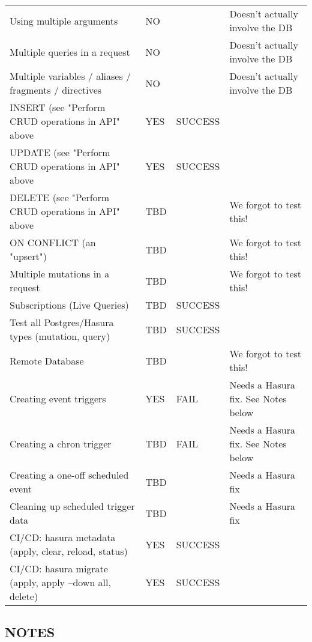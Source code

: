 \documentclass[11pt]{article}
\begin{document}
\begin{center}
\begin{tabular}{llll}
Using multiple arguments & NO &  & Doesn't actually involve the DB\\
Multiple queries in a request & NO &  & Doesn't actually involve the DB\\
Multiple variables / aliases / fragments / directives & NO &  & Doesn't actually involve the DB\\
INSERT (see "Perform CRUD operations in API" above & YES & SUCCESS & \\
UPDATE (see "Perform CRUD operations in API" above & YES & SUCCESS & \\
DELETE (see "Perform CRUD operations in API" above & TBD &  & We forgot to test this!\\
ON CONFLICT (an "upsert") & TBD &  & We forgot to test this!\\
Multiple mutations in a request & TBD &  & We forgot to test this!\\
Subscriptions (Live Queries) & TBD & SUCCESS & \\
Test all Postgres/Hasura types (mutation, query) & TBD & SUCCESS & \\
Remote Database & TBD &  & We forgot to test this!\\
Creating event triggers & YES & FAIL & Needs a Hasura fix. See Notes below\\
Creating a chron trigger & TBD & FAIL & Needs a Hasura fix. See Notes below\\
Creating a one-off scheduled event & TBD &  & Needs a Hasura fix\\
Cleaning up scheduled trigger data & TBD &  & Needs a Hasura fix\\
CI/CD: hasura metadata (apply, clear, reload, status) & YES & SUCCESS & \\
CI/CD: hasura migrate (apply, apply --down all, delete) & YES & SUCCESS & \\
\end{tabular}
\end{center}

\subsection{NOTES}
\label{sec:org01b9203}
\end{document}
